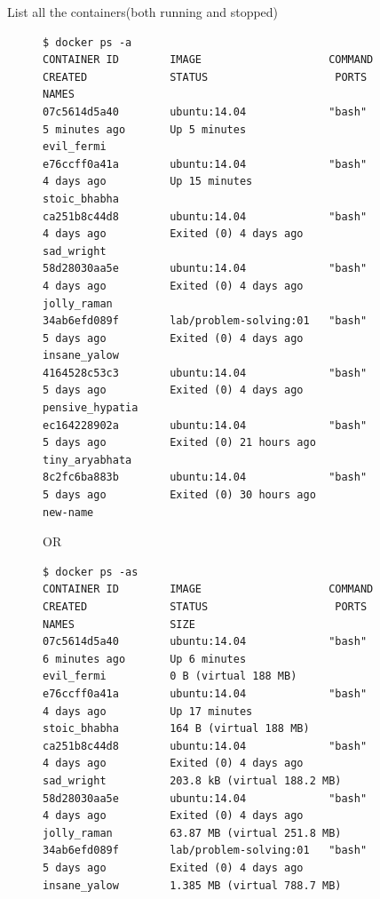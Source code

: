 \documentclass[11pt]{article}
\begin{document}
\begin{description}
\item[{List all the containers(both running and stopped)}] \begin{verbatim}
$ docker ps -a
CONTAINER ID        IMAGE                    COMMAND             CREATED             STATUS                    PORTS               NAMES
07c5614d5a40        ubuntu:14.04             "bash"              5 minutes ago       Up 5 minutes                                  evil_fermi
e76ccff0a41a        ubuntu:14.04             "bash"              4 days ago          Up 15 minutes                                 stoic_bhabha
ca251b8c44d8        ubuntu:14.04             "bash"              4 days ago          Exited (0) 4 days ago                         sad_wright
58d28030aa5e        ubuntu:14.04             "bash"              4 days ago          Exited (0) 4 days ago                         jolly_raman
34ab6efd089f        lab/problem-solving:01   "bash"              5 days ago          Exited (0) 4 days ago                         insane_yalow
4164528c53c3        ubuntu:14.04             "bash"              5 days ago          Exited (0) 4 days ago                         pensive_hypatia
ec164228902a        ubuntu:14.04             "bash"              5 days ago          Exited (0) 21 hours ago                       tiny_aryabhata
8c2fc6ba883b        ubuntu:14.04             "bash"              5 days ago          Exited (0) 30 hours ago                       new-name
\end{verbatim}
OR
\begin{verbatim}
$ docker ps -as
CONTAINER ID        IMAGE                    COMMAND             CREATED             STATUS                    PORTS               NAMES               SIZE
07c5614d5a40        ubuntu:14.04             "bash"              6 minutes ago       Up 6 minutes                                  evil_fermi          0 B (virtual 188 MB)
e76ccff0a41a        ubuntu:14.04             "bash"              4 days ago          Up 17 minutes                                 stoic_bhabha        164 B (virtual 188 MB)
ca251b8c44d8        ubuntu:14.04             "bash"              4 days ago          Exited (0) 4 days ago                         sad_wright          203.8 kB (virtual 188.2 MB)
58d28030aa5e        ubuntu:14.04             "bash"              4 days ago          Exited (0) 4 days ago                         jolly_raman         63.87 MB (virtual 251.8 MB)
34ab6efd089f        lab/problem-solving:01   "bash"              5 days ago          Exited (0) 4 days ago                         insane_yalow        1.385 MB (virtual 788.7 MB)

\end{verbatim}
\end{description}
\end{document}
